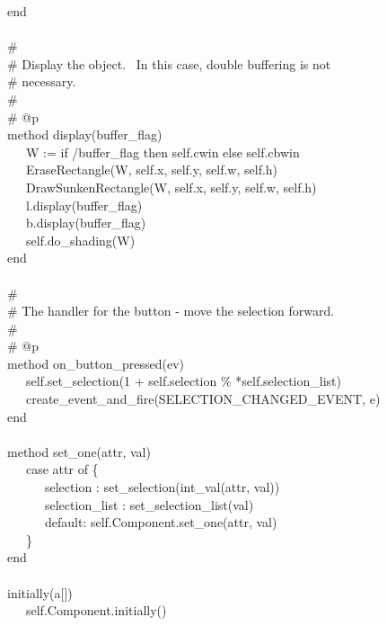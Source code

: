 {\>   end \\
\ \\
\>   \# \\
\>   \# Display the object. \ In this case, double buffering is not \\
\>   \# necessary. \\
\>   \# \\
\>   \# @p \\
\>   method display(buffer\_flag) \\
\>   \ \ \ W := if /buffer\_flag then self.cwin else self.cbwin \\
\>   \ \ \ EraseRectangle(W, self.x, self.y, self.w, self.h) \\
\>   \ \ \ DrawSunkenRectangle(W, self.x, self.y, self.w, self.h) \\
\>   \ \ \ l.display(buffer\_flag) \\
\>   \ \ \ b.display(buffer\_flag) \\
\>   \ \ \ self.do\_shading(W) \\
\>   end \\
\ \\
\>   \# \\
\>   \# The handler for the button - move the selection forward. \\
\>   \# \\
\>   \# @p \\
\>   method on\_button\_pressed(ev) \\
\>   \ \ \ self.set\_selection(1 + self.selection \%
*self.selection\_list) \\
\>   \ \ \ create\_event\_and\_fire(SELECTION\_CHANGED\_EVENT, e) \\
\>   end \\
\ \\
\>   method set\_one(attr, val) \\
\>   \ \ \ case attr of \{ \\
\>   \ \ \ \ \ \ {\textquotedbl}selection{\textquotedbl} :
set\_selection(int\_val(attr, val)) \\
\>   \ \ \ \ \ \ {\textquotedbl}selection\_list{\textquotedbl} :
set\_selection\_list(val) \\
\>   \ \ \ \ \ \ default: self.Component.set\_one(attr, val) \\
\>   \ \ \ \} \\
\>   end \\
\ \\
\>   initially(a[])  \\
\>   \ \ \ self.Component.initially() \\
}
